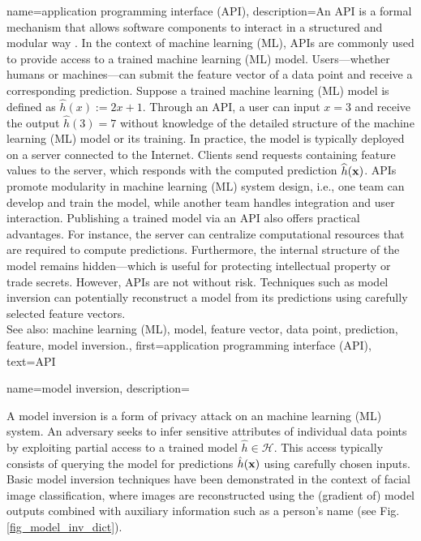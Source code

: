 { 
{name={application programming interface (API)},
		description={An  API is a formal mechanism that 
			allows software components to interact in a structured and modular way \cite{RestfulBook2013}.
			In the context of machine learning (ML), APIs are commonly used to provide access to a trained machine learning (ML) model. 
			Users—whether humans or machines—can submit the feature vector of a data point and receive 
			a corresponding prediction. Suppose a trained machine learning (ML) model is defined 
			as $\widehat{h}(x) := 2 x + 1$. Through an API, a user 
			can input $x = 3$ and receive the output $\widehat{h}(3) = 7$ 
			without knowledge of the detailed structure of the machine learning (ML) model or its training. 
			In practice, the model is typically deployed on a server connected to the Internet. 
			Clients send requests containing feature values to the server, which responds with 
			the computed prediction $\widehat{h}({\bf x})$. APIs promote modularity 
			in machine learning (ML) system design, i.e., one team can develop and train the model, while another team
			handles integration and user interaction. Publishing a trained model via an API also 
			offers practical advantages. For instance, the server can centralize computational resources that 
			are required to compute predictions. Furthermore, the internal structure of the model remains 
			hidden—which is useful for protecting intellectual property or trade secrets. 
			However, APIs are not without risk. Techniques such as model inversion can potentially reconstruct a 
			model from its predictions using carefully selected feature vectors.
					\\
			See also: machine learning (ML), model, feature vector, data point, prediction, feature, model inversion.},
		first={application programming interface (API)},
		text={API}
}

{name={model inversion},
 	description={A model inversion is a form of privacy attack on an machine learning (ML) system. 
  		An adversary seeks to infer sensitive attributes of individual data points by exploiting partial access 
  		to a trained model $\hat{h} \in \mathcal{H}$. This access typically consists of 
  		querying the model for predictions $\hat{h}({\bf x})$ using carefully chosen inputs. 
  		Basic model inversion techniques have been demonstrated in the context of facial image 
  		classification, where images are reconstructed using the (gradient of) model outputs 
  		combined with auxiliary information such as a person’s name \cite{Fredrikson2015} (see Fig. \ref{fig_model_inv_dict}).
  		\begin{figure}[H]
			\begin{center}
			\begin{tikzpicture}[scale=1.5]
  			

\end{tikzpicture}
\end{center}
\end{figure}}}}
